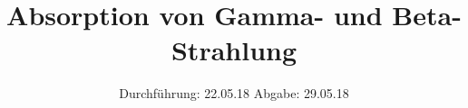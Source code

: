 

\subject{V704}
\title{Absorption von Gamma- und Beta-Strahlung}
\date{%
  Durchführung: 22.05.18
  \hspace{3em}
  Abgabe: 29.05.18
}



\maketitle
\thispagestyle{empty}
\tableofcontents
\newpage






\printbibliography{}


